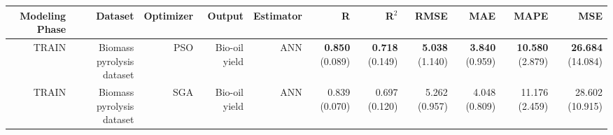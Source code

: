 \begin{table}
\centering
\label{eml___comparison_datasets_table_ann_biomass_pyrolysis_dataset_train.tex}
\begin{tabular}{rrrrrrrrrrr}
\toprule
Modeling Phase &                   Dataset & Optimizer &        Output & Estimator &                    R &                R$^2$ &                 RMSE &                  MAE &                  MAPE &                    MSE \\
\midrule
         TRAIN & Biomass pyrolysis dataset &       PSO & Bio-oil yield &       ANN & { \bf 0.850} (0.089) & { \bf 0.718} (0.149) & { \bf 5.038} (1.140) & { \bf 3.840} (0.959) & { \bf 10.580} (2.879) & { \bf 26.684} (14.084) \\
         TRAIN & Biomass pyrolysis dataset &       SGA & Bio-oil yield &       ANN &        0.839 (0.070) &        0.697 (0.120) &        5.262 (0.957) &        4.048 (0.809) &        11.176 (2.459) &        28.602 (10.915) \\
\bottomrule
\end{tabular}
\end{table}
